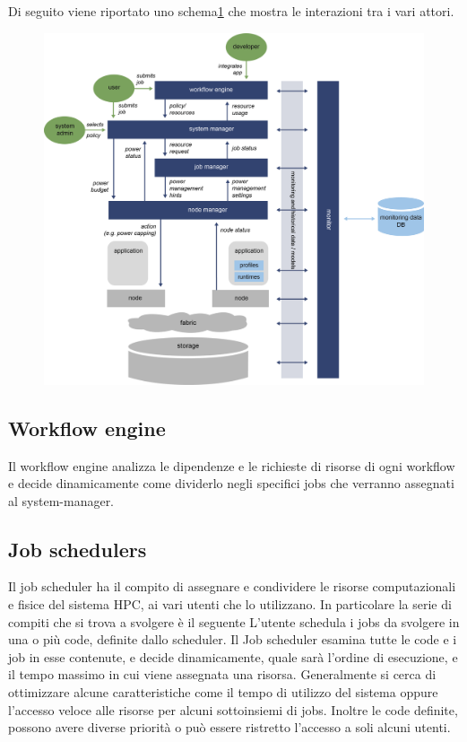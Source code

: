 Di seguito viene riportato uno schema\ref{fig:powerstackscheme} che mostra le interazioni tra i vari attori.
\begin{figure}[H]
    \centering
    \includegraphics[width=\textwidth]{img/REGALE-Architecture-1536x1421.png} 
    \label{fig:powerstackscheme}
\end{figure}
\subsection{Workflow engine}
Il workflow engine analizza le dipendenze e le richieste di risorse di ogni workflow e decide dinamicamente come dividerlo negli specifici jobs che verranno assegnati al system-manager.

\subsection{Job schedulers}
Il job scheduler ha il compito di assegnare e condividere le risorse computazionali e fisice del sistema HPC, ai vari utenti che lo utilizzano. In particolare la serie di compiti che si trova a svolgere è il seguente L'utente schedula i jobs da svolgere in una o più code, definite dallo scheduler. Il Job scheduler esamina tutte le code e i job in esse contenute, e decide dinamicamente, quale sarà l'ordine di esecuzione, e il tempo massimo in cui viene assegnata una risorsa. Generalmente si cerca di ottimizzare alcune caratteristiche come il tempo di utilizzo del sistema oppure l'accesso veloce alle risorse per alcuni sottoinsiemi di jobs. Inoltre le code definite, possono avere diverse priorità o può essere ristretto l'accesso a soli alcuni utenti. 


